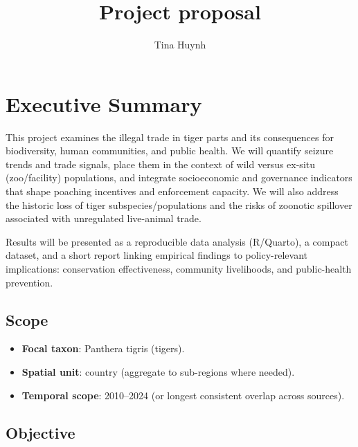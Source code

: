 \documentclass[
]{article}
\title{Project proposal}
\author{Tina Huynh}
\date{}
\begin{document}
\maketitle

{
\setcounter{tocdepth}{3}
\tableofcontents
}
\section{Executive Summary}\label{executive-summary}

This project examines the illegal trade in tiger parts and its
consequences for biodiversity, human communities, and public health. We
will quantify seizure trends and trade signals, place them in the
context of wild versus ex-situ (zoo/facility) populations, and integrate
socioeconomic and governance indicators that shape poaching incentives
and enforcement capacity. We will also address the historic loss of
tiger subspecies/populations and the risks of zoonotic spillover
associated with unregulated live-animal trade.

Results will be presented as a reproducible data analysis (R/Quarto), a
compact dataset, and a short report linking empirical findings to
policy-relevant implications: conservation effectiveness, community
livelihoods, and public-health prevention.

\subsection{Scope}\label{scope}

\begin{itemize}
\item
  \textbf{Focal taxon}: Panthera tigris (tigers).
\item
  \textbf{Spatial unit}: country (aggregate to sub-regions where
  needed).
\item
  \textbf{Temporal scope}: 2010--2024 (or longest consistent overlap
  across sources).
\end{itemize}

\subsection{Objective}\label{objective}
\end{document}
